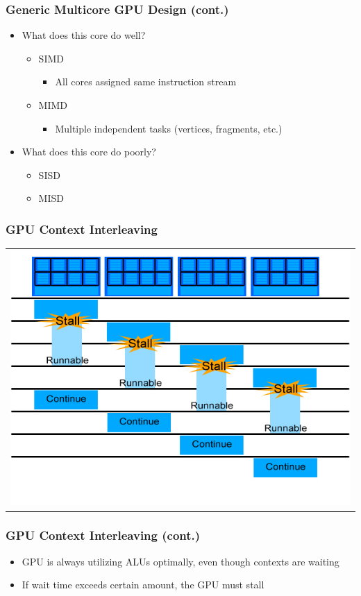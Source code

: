 \documentclass{beamer}
\begin{document}
\begin{frame}
	\frametitle{Generic Multicore GPU Design (cont.)}
	\begin{itemize}
		\item What does this core do well?
		\begin{itemize}
			\item SIMD
			\begin{itemize}
				\item All cores assigned same instruction stream
			\end{itemize}
			\item MIMD
			\begin{itemize}
				\item Multiple independent tasks (vertices, fragments, etc.)
			\end{itemize}
		\end{itemize}
		\item What does this core do poorly?
		\begin{itemize}
			\item SISD
			\item MISD
		\end{itemize}
	\end{itemize}
\end{frame}

\begin{frame}
	\frametitle{GPU Context Interleaving}
	\begin{tabular}{c}
		\includegraphics[width=.75\textwidth]{GPU-context-interleaving.jpg}
	\end{tabular}
\end{frame}

\begin{frame}
	\frametitle{GPU Context Interleaving (cont.)}
	\begin{itemize}
		\item GPU is always utilizing ALUs optimally, even though contexts are waiting
		\item If wait time exceeds certain amount, the GPU must stall
	\end{itemize}
\end{frame}
\end{document}
